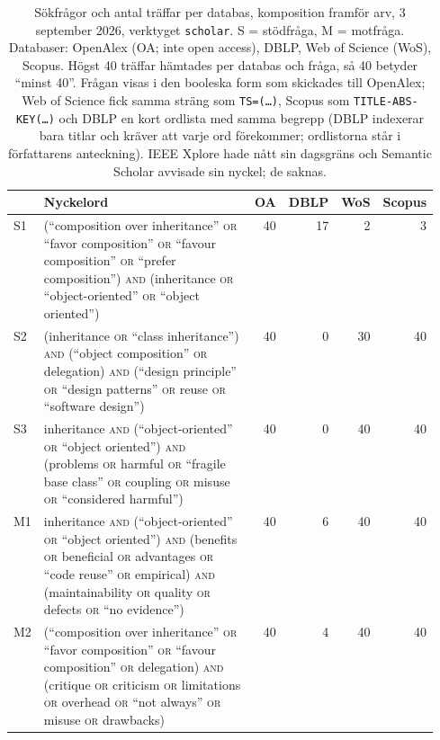\begin{table}[!htb]
  \centering
  \caption{Sökfrågor och antal träffar per databas,
    komposition framför arv, 3 september 2026, verktyget
    \texttt{scholar}.  S = stödfråga, M = motfråga.  Databaser: OpenAlex
    (OA; inte \foreignlanguage{english}{open access}), DBLP, Web of
    Science (WoS), Scopus.  Högst 40 träffar hämtades per databas och
    fråga, så 40 betyder \enquote{minst 40}.  Frågan visas i den
    booleska form som skickades till OpenAlex; Web of Science fick samma
    sträng som \texttt{TS=(\dots)}, Scopus som
    \texttt{TITLE-ABS-KEY(\dots)} och DBLP en kort ordlista med samma
    begrepp (DBLP indexerar bara titlar och kräver att varje ord
    förekommer; ordlistorna står i författarens anteckning).  IEEE
    Xplore hade nått sin dagsgräns och Semantic Scholar avvisade sin
    nyckel; de saknas.}
  \label{tab:sok-queries-D-klasser}
  \footnotesize
  \begin{tabular}{@{}lp{0.55\linewidth}rrrr@{}}
    \toprule
    & Nyckelord & OA & DBLP & WoS & Scopus \\
    \midrule
    S1 & (\enquote{composition over inheritance} \textsc{or} \enquote{favor composition} \textsc{or} \enquote{favour composition} \textsc{or} \enquote{prefer composition}) \textsc{and} (inheritance \textsc{or} \enquote{object-oriented} \textsc{or} \enquote{object oriented})
       & 40 & 17 & 2 & 3 \\
    S2 & (inheritance \textsc{or} \enquote{class inheritance}) \textsc{and} (\enquote{object composition} \textsc{or} delegation) \textsc{and} (\enquote{design principle} \textsc{or} \enquote{design patterns} \textsc{or} reuse \textsc{or} \enquote{software design})
       & 40 & 0 & 30 & 40 \\
    S3 & inheritance \textsc{and} (\enquote{object-oriented} \textsc{or} \enquote{object oriented}) \textsc{and} (problems \textsc{or} harmful \textsc{or} \enquote{fragile base class} \textsc{or} coupling \textsc{or} misuse \textsc{or} \enquote{considered harmful})
       & 40 & 0 & 40 & 40 \\
    \midrule
    M1 & inheritance \textsc{and} (\enquote{object-oriented} \textsc{or} \enquote{object oriented}) \textsc{and} (benefits \textsc{or} beneficial \textsc{or} advantages \textsc{or} \enquote{code reuse} \textsc{or} empirical) \textsc{and} (maintainability \textsc{or} quality \textsc{or} defects \textsc{or} \enquote{no evidence})
       & 40 & 6 & 40 & 40 \\
    M2 & (\enquote{composition over inheritance} \textsc{or} \enquote{favor composition} \textsc{or} \enquote{favour composition} \textsc{or} delegation) \textsc{and} (critique \textsc{or} criticism \textsc{or} limitations \textsc{or} overhead \textsc{or} \enquote{not always} \textsc{or} misuse \textsc{or} drawbacks)
       & 40 & 4 & 40 & 40 \\
    \bottomrule
  \end{tabular}
\end{table}

